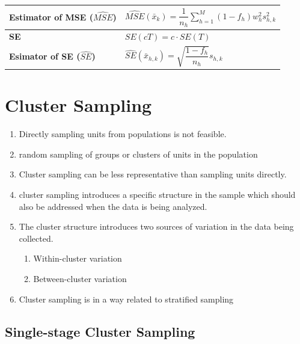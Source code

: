 \begin{longtable}{|p{5cm}|p{9cm}|}
    \textbf{Estimator of MSE ($\hat{MSE}$)} & $
        \hat{MSE}(\bar{x}_k) = \dfrac{1}{n_h}
        \displaystyle\sum_{h=1}^{M}
        (1-f_h)w_h^2 s_{h,k}^2
    $\\[1ex]
    \hline

    \textbf{SE} & $
        SE(cT) = c\cdot SE(T)
    $\\[1ex]
    \hline
    
    \textbf{Esimator of SE ($\hat{SE}$)} & $
        \hat{SE}(\bar{x}_{h,k}) =
        \sqrt{\dfrac{1-f_h}{n_h}}s_{h,k}
    $\\[1ex]
    \hline
\end{longtable}



\section{Cluster Sampling \cite{ism-1}}\label{Cluster Sampling}

\begin{enumerate}
    \item Directly sampling units from populations is not feasible.

    \item random sampling of groups or clusters of units in the population

    \item Cluster sampling can be less representative than sampling units directly.

    \item cluster sampling introduces a specific structure in the sample which should also be addressed when the data is being analyzed.

    \item The cluster structure introduces two sources of variation in the data being collected.
    \begin{enumerate}
        \item Within-cluster variation
        \item Between-cluster variation
    \end{enumerate}

    \item Cluster sampling is in a way related to stratified sampling
\end{enumerate}

\subsection{Single-stage Cluster Sampling \cite{ism-1}} \label{Single-stage Cluster Sampling}

